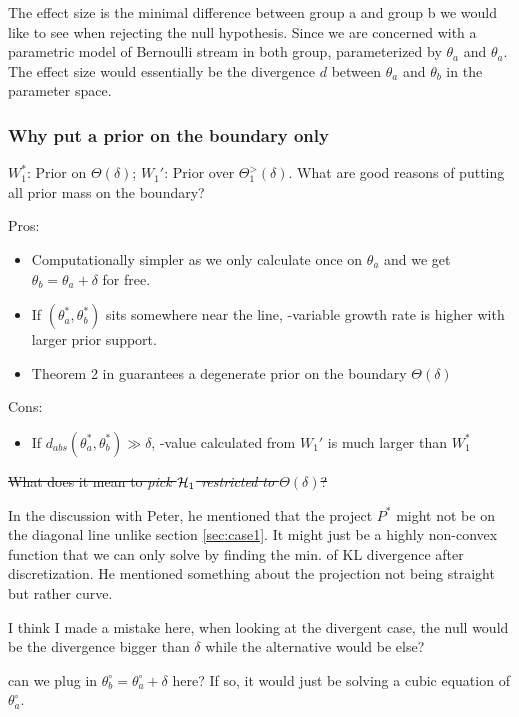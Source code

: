 The effect size is the minimal difference between group a and group b
we would like to see when rejecting the null hypothesis.
Since we are concerned with a parametric model of Bernoulli stream in both group,
parameterized by $\theta_a$ and $\theta_a$.
The effect size would essentially be the divergence $d$ between $\theta_a$ and $\theta_b$
in the parameter space.

\subsubsection{Why put a prior on the boundary only}

$W_1^*$: Prior on $\Theta(\delta)$; $W_1'$: Prior over $\Theta_1^>(\delta)$.
What are good reasons of putting all prior mass on the boundary?

Pros:
\begin{itemize}
	\item Computationally simpler as we only calculate once on $\theta_a$
	      and we get $\theta_b = \theta_a + \delta$ for free.
	\item If $(\theta_a^*, \theta_b^*)$ sits somewhere near the line,
	      \E-variable growth rate is higher with larger prior support.
	\item Theorem 2 in \cite{turnerExactAnytimevalidConfidence2023} guarantees a degenerate prior
	      on the boundary $\Theta(\delta)$
\end{itemize}

Cons:
\begin{itemize}
	\item If $d_{abs}(\theta_a^*, \theta_b^*) \gg \delta $,
	      \E-value calculated from $W_1'$ is much larger than $W_1^*$
\end{itemize}

\sout{What does it mean to \emph{pick $\mathcal{H}_1$ restricted to $\Theta(\delta)$}?}

In the discussion with Peter, he mentioned that the project $P^*$ might not be on the diagonal line unlike section \ref{sec:case1}.
It might just be a highly non-convex function that we can only solve by finding the min. of KL divergence after discretization.
He mentioned something about the projection not being straight but rather curve.

I think I made a mistake here, when looking at the divergent case,
the null would be the divergence bigger than $\delta$ while the alternative would be else?

{\color{red}
	can we plug in $\theta_b^\circ = \theta_a^\circ + \delta$ here? If so,
	it would just be solving a cubic equation of $\theta_a^\circ$.
}

